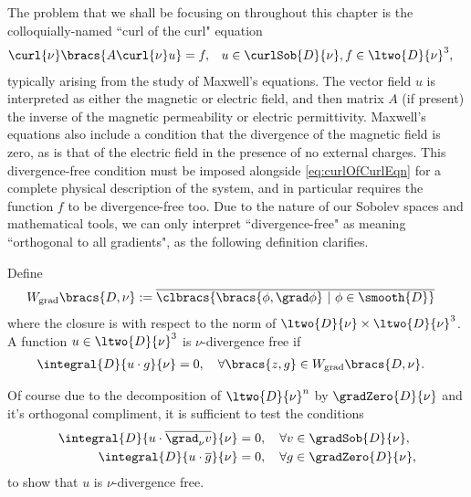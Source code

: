 The problem that we shall be focusing on throughout this chapter is the colloquially-named ``curl of the curl" equation 
\begin{align} \label{eq:curlOfCurlEqn}
	\curl{\nu}\bracs{A\curl{\nu}u} = f, &\quad u\in\curlSob{D}{\nu}, f\in\ltwo{D}{\nu}^3,
\end{align}
typically arising from the study of Maxwell's equations.
The vector field $u$ is interpreted as either the magnetic or electric field, and then matrix $A$ (if present) the inverse of the magnetic permeability or electric permittivity.
Maxwell's equations also include a condition that the divergence of the magnetic field is zero, as is that of the electric field in the presence of no external charges.
This divergence-free condition must be imposed alongside \eqref{eq:curlOfCurlEqn} for a complete physical description of the system, and in particular requires the function $f$ to be divergence-free too.
Due to the nature of our Sobolev spaces and mathematical tools, we can only interpret ``divergence-free" as meaning ``orthogonal to all gradients", as the following definition clarifies.
\begin{definition}
	Define 
	\begin{align*}
		W_{\mathrm{grad}}\bracs{D,\nu} &:= \overline{\clbracs{ \bracs{\phi, \grad\phi} \ \vert \ \phi\in\smooth{D} }}
	\end{align*}
	where the closure is with respect to the norm of $\ltwo{D}{\nu}\times\ltwo{D}{\nu}^3$.
	A function $u\in\ltwo{D}{\nu}^3$ is $\nu$-divergence free if
	\begin{align*}
		\integral{D}{ u\cdot g }{\nu} &= 0, \quad \forall \bracs{z,g}\in W_{\mathrm{grad}}\bracs{D,\nu}.
	\end{align*}	 
\end{definition}

Of course due to the decomposition of $\ltwo{D}{\nu}^n$ by $\gradZero{D}{\nu}$ and it's orthogonal compliment, it is sufficient to test the conditions
\begin{align*}
	\integral{D}{ u\cdot\overline{\grad_{\nu}v} }{\nu} &= 0, \quad \forall v\in\gradSob{D}{\nu}, \\
	\integral{D}{ u\cdot\overline{g} }{\nu} &= 0, \quad \forall g\in\gradZero{D}{\nu},
\end{align*}
to show that $u$ is $\nu$-divergence free.


